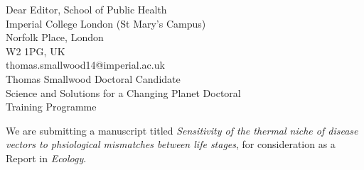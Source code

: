 \documentclass[blank]{impletter}
\begin{document}
{
Dear Editor,
}
{School of Public Health\\
Imperial College London (St Mary's Campus)\\
Norfolk Place, London\\
W2 1PG, UK\\
thomas.smallwood14@imperial.ac.uk\\
}
{
Thomas Smallwood
}
{
Doctoral Candidate\\
Science and Solutions for a Changing Planet Doctoral\\Training Programme
}
\informal


We are submitting a manuscript titled {\it Sensitivity of the thermal niche of disease vectors to phsiological mismatches between life stages}, for consideration as a Report in {\it Ecology}. 

\end{document}

